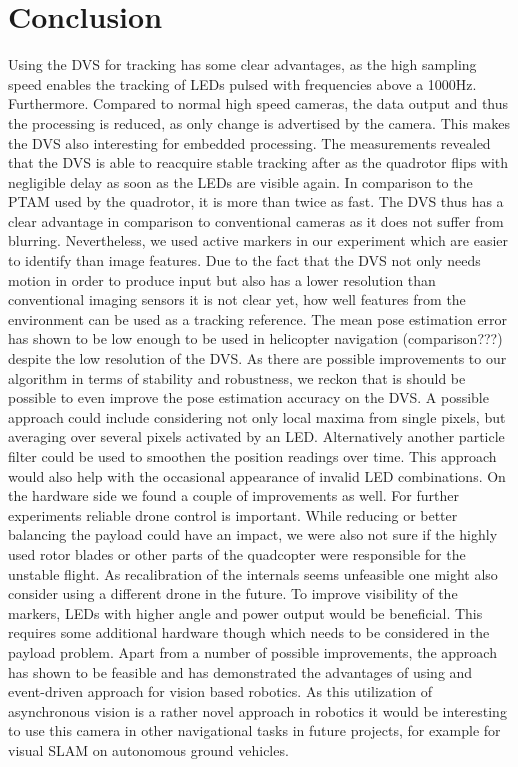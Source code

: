 \chapter{Conclusion}\label{sec:conclusion}

Using the DVS for tracking has some clear advantages, as the high sampling speed enables the tracking of LEDs pulsed with frequencies above a 1000Hz. Furthermore. Compared to normal high speed cameras, the data output and thus the processing is reduced, as only change is advertised by the camera. This makes the DVS also interesting for embedded processing.
The measurements revealed that the DVS is able to reacquire stable tracking after as the quadrotor flips with negligible delay as soon as the LEDs are visible again. In comparison to the PTAM used by the quadrotor, it is more than twice as fast. The DVS thus has a clear advantage in comparison to conventional cameras as it does not suffer from blurring. Nevertheless, we used active markers in our experiment which are easier to identify than image features. Due to the fact that the DVS not only needs motion in order to produce input but also has a lower resolution than conventional imaging sensors it is not clear yet, how well features from the environment can be used as a tracking reference. The mean pose estimation error has shown to be low enough to be used in helicopter navigation (comparison???) despite the low resolution of the DVS. 
As there are possible improvements to our algorithm in terms of stability and robustness, we reckon that is should be possible to even improve the pose estimation accuracy on the DVS. A possible approach could include considering not only local maxima from single pixels, but averaging over several pixels activated by an LED. Alternatively another particle filter could be used to smoothen the position readings over time. This approach would also help with the occasional appearance of invalid LED combinations.
On the hardware side we found a couple of improvements as well. For further experiments reliable drone control is important. While reducing or better balancing the payload could have an impact, we were also not sure if the highly used rotor blades or other parts of the quadcopter were responsible for the unstable flight. As recalibration of the internals seems unfeasible one might also consider using a different drone in the future. To improve visibility of the markers, LEDs with higher angle and power output would be beneficial. This requires some additional hardware though which needs to be considered in the payload problem. 
Apart from a number of possible improvements, the approach has shown to be feasible and has demonstrated the advantages of using and event-driven approach for vision based robotics. As this utilization of asynchronous vision is a rather novel approach in robotics it would be interesting to use this camera in other navigational tasks in future projects, for example for visual SLAM on autonomous ground vehicles.